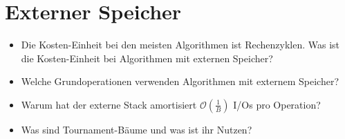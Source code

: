 \documentclass[a4paper,12pt]{article}
\begin{document}
\section{Externer Speicher}
\begin{itemize}
    \item Die Kosten-Einheit bei den meisten Algorithmen ist Rechenzyklen.
          Was ist die Kosten-Einheit bei Algorithmen mit externen Speicher?
    \item Welche Grundoperationen verwenden Algorithmen mit
          externem Speicher?
    \item Warum hat der externe Stack amortisiert
          $\mathcal{O}(\frac{1}{B})$ I/Os pro Operation?
    \item Was sind Tournament-Bäume und was ist ihr Nutzen?
\end{itemize}
\clearpage
\end{document}

